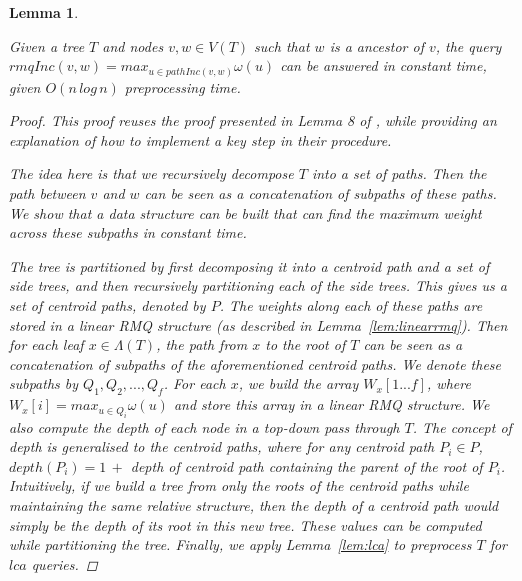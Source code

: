 \documentclass{article}
\newcommand{\leafset}{\Lambda}
\newcommand{\weight}{\omega}
\newtheorem{rmqinc}[incompatibility]{Lemma}
\begin{document}
    \begin{rmqinc}
        \label{lem:rmqinc}

        Given a tree $T$ and nodes $v, w \in V(T)$ such that $w$ is a ancestor of $v$, the query $rmqInc(v, w) = max_{u \in pathInc(v, w)}\weight(u)$ can be answered in constant time, given $O(n\,log\,n)$ preprocessing time.

        \begin{proof}
            This proof reuses the proof presented in Lemma 8 of \cite{jansson2018algorithms}, while providing an explanation of how to implement a key step in their procedure.

            The idea here is that we recursively decompose $T$ into a set of paths. Then the path between $v$ and $w$ can be seen as a concatenation of subpaths of these paths. We show that a data structure can be built that can find the maximum weight across these subpaths in constant time.

            The tree is partitioned by first decomposing it into a centroid path and a set of side trees, and then recursively partitioning each of the side trees. This gives us a set of centroid paths, denoted by $P$. The weights along each of these paths are stored in a linear RMQ structure (as described in Lemma~\ref{lem:linearrmq}). Then for each leaf $x \in \leafset(T)$, the path from $x$ to the root of $T$ can be seen as a concatenation of subpaths of the aforementioned centroid paths. We denote these subpaths by $Q_1, Q_2, ..., Q_f$. For each $x$, we build the array $W_x[1 ... f]$, where $W_x[i] = max_{u \in Q_i}\weight(u)$ and store this array in a linear RMQ structure. We also compute the depth of each node in a top-down pass through $T$. The concept of depth is generalised to the centroid paths, where for any centroid path $P_i \in P$, $depth(P_i) = 1\, +$ depth of centroid path containing the parent of the root of $P_i$. Intuitively, if we build a tree from only the roots of the centroid paths while maintaining the same relative structure, then the depth of a centroid path would simply be the depth of its root in this new tree. These values can be computed while partitioning the tree. Finally, we apply Lemma~\ref{lem:lca} to preprocess $T$ for $lca$ queries.


\end{proof}
\end{rmqinc}
\end{document}
